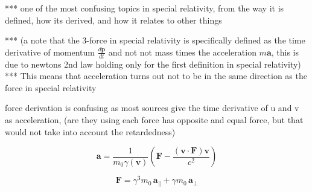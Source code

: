 *** one of the most confusing topics in special relativity, from the way it is defined, how its derived, and how it relates to other things\newline

*** (a note that the 3-force in special relativity is specifically defined as the time derivative of momentum $\frac{d\mathbf{p}}{dt}$ and not not mass times the acceleration $m\mathbf{a}$, this is due to newtons 2nd law holding only for the first definition in special relativity) \newline
*** This means that acceleration turns out not to be in the same direction as the force in special relativity\newline

force derivation is confusing as most sources give the time derivative of u and v as acceleration, (are they using each force has opposite and equal force, but that would not take into account the retardedness)

\begin{equation}%
	\mathbf{a} = \frac{1}{m_0 \gamma(\mathbf{v})} \left( \mathbf{F} - \frac{ ( \mathbf{v} \cdot \mathbf{F} ) \mathbf{v} }{c^2} \right)
\end{equation}%

\begin{equation}%
	\mathbf{F} = \gamma^3 m_0 \, \mathbf{a}_\parallel + \gamma m_0 \, \mathbf{a}_\perp
\end{equation}%


